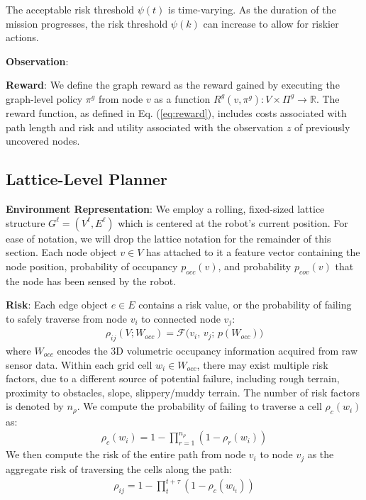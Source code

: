\documentclass[letterpaper]{article} %
\newcommand{\ph}[1]{{\textbf{#1}:}} %
\begin{document}
The acceptable risk threshold $\psi(t)$ is time-varying. As the duration of the mission progresses, the risk threshold $\psi(k)$ can increase to allow for riskier actions.

\ph{Observation}

\ph{Reward} We define the graph reward as the reward gained by executing the graph-level policy $\pi^g$ from node $v$ as a function $R^g(v, \pi^g): V \times \Pi^g \to \mathbb{R}$. The reward function, as defined in Eq. (\ref{eq:reward}), includes costs associated with path length and risk and utility associated with the observation $z$ of previously uncovered nodes. 


\subsection{Lattice-Level Planner} 

\ph{Environment Representation} We employ a rolling, fixed-sized lattice structure $G^\ell = (V^\ell, E^\ell)$ which is centered at the robot's current position. For ease of notation, we will drop the lattice notation for the remainder of this section. Each node object $v \in V$ has attached to it a feature vector containing the node position, probability of occupancy $p_{occ}(v)$, and probability $p_{cov}(v)$ that the node has been sensed by the robot. 

\ph{Risk} Each edge object $e \in E$ contains a risk value, or the probability of failing to safely traverse from node $v_i$ to connected node $v_j$:
\begin{align}
    \rho_{ij}(V; W_{occ}) = \mathcal{F} \big(v_i, \, v_j; \, p(W_{occ})\big)
\end{align}
where $W_{occ}$ encodes the 3D volumetric occupancy information acquired from raw sensor data. Within each grid cell $w_i \in W_{occ}$, there may exist multiple risk factors, due to a different source of potential failure, including rough terrain, proximity to obstacles, slope, slippery/muddy terrain. The number of risk factors is denoted by $n_\rho$. We compute the probability of failing to traverse a cell $\rho_c(w_i)$ as:
\begin{align}
    \rho_c(w_i) = 1-\prod_{r=1}^{n_\rho} (1-\rho_r(w_i))
\end{align}
We then compute the risk of the entire path from node $v_i$ to node $v_j$ as the aggregate risk of traversing the cells along the path:
\begin{align}
    \rho_{ij} = 1-\prod_t^{t+\tau}(1-\rho_c(w_{i_t}))
\end{align}
\end{document}

